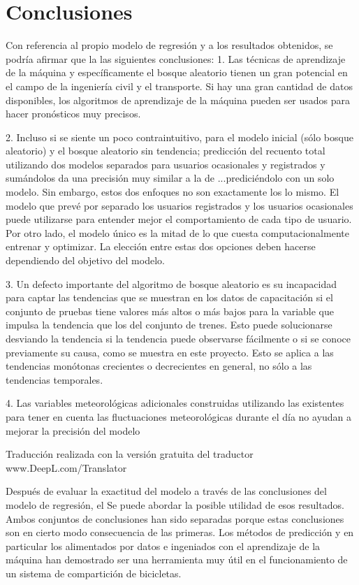 \section{Conclusiones}

Con referencia al propio modelo de regresión y a los resultados obtenidos, se podría afirmar que la las siguientes conclusiones:
1. Las técnicas de aprendizaje de la máquina y específicamente el bosque aleatorio tienen un gran potencial en el campo de la ingeniería civil y el transporte. Si hay una gran cantidad de datos disponibles, los algoritmos de aprendizaje de la máquina pueden ser usados para hacer pronósticos muy precisos.

2. Incluso si se siente un poco contraintuitivo, para el modelo inicial (sólo bosque aleatorio) y el bosque aleatorio sin tendencia; predicción del recuento total utilizando dos modelos separados para usuarios ocasionales y registrados y sumándolos da una precisión muy similar a la de ...prediciéndolo con un solo modelo. Sin embargo, estos dos enfoques no son exactamente los lo mismo. El modelo que prevé por separado los usuarios registrados y los usuarios ocasionales puede utilizarse para entender mejor el comportamiento de cada tipo de usuario. Por otro lado, el modelo único es la mitad de lo que cuesta computacionalmente entrenar y optimizar. La elección entre estas dos opciones deben hacerse dependiendo del objetivo del modelo.

3. Un defecto importante del algoritmo de bosque aleatorio es su incapacidad para captar las tendencias que se muestran en los datos de capacitación si el conjunto de pruebas tiene valores más altos o más bajos para la variable que impulsa la tendencia que los del conjunto de trenes. Esto puede solucionarse desviando la tendencia si la tendencia puede observarse fácilmente o si se conoce previamente su causa, como se muestra en este proyecto. Esto se aplica a las tendencias monótonas crecientes o decrecientes en general, no sólo a las tendencias temporales.

4. Las variables meteorológicas adicionales construidas utilizando las existentes para tener en cuenta las fluctuaciones meteorológicas durante el día no ayudan a mejorar la precisión del modelo

Traducción realizada con la versión gratuita del traductor www.DeepL.com/Translator

Después de evaluar la exactitud del modelo a través de las conclusiones del modelo de regresión, el Se puede abordar la posible utilidad de esos resultados. Ambos conjuntos de conclusiones han sido separadas porque estas conclusiones son en cierto modo consecuencia de las primeras.
Los métodos de predicción y en particular los alimentados por datos e ingeniados con el aprendizaje de la máquina han demostrado ser una herramienta muy útil en el funcionamiento de un sistema de compartición de bicicletas.

